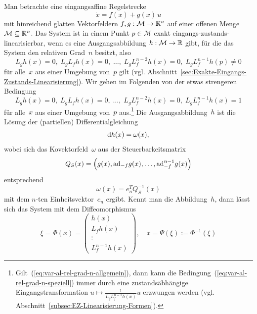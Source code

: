 Man betrachte eine eingangsaffine Regelstrecke 
\begin{equation}
\dot{x}=f(x)+g(x)\,u\label{eq:var-basissystem-ohne-ausgang}
\end{equation}
mit hinreichend glatten Vektorfeldern $f,g:\mathcal{M}\to{\mathbb{R}}^{n}$
auf einer offenen Menge $\mathcal{M}\subseteq{\mathbb{R}}^{n}$. Das System
ist in einem Punkt $p\in\mathcal{M}$ exakt eingangs-zustands-linearisierbar,
wenn es eine Ausgangsabbildung $h:\mathcal{M}\to{\mathbb{R}}$ gibt, für die
das System den relativen Grad~$n$ besitzt, also
\begin{equation}
L_{g}h(x)=0,\;L_{g}L_{f}h(x)=0,\;\ldots,\;L_{g}L_{f}^{n-2}h(x)=0,\;L_{g}L_{f}^{n-1}h(p)\neq0\label{eq:var-al-rel-grad-n-allgemein}
\end{equation}
für alle~$x$ aus einer Umgebung von~$p$ gilt (vgl. Abschnitt~\ref{sec:Exakte-Eingangs-Zustands-Linearisierung}).
Wir gehen im Folgenden von der etwas strengeren Bedingung
\begin{equation}
L_{g}h(x)=0,\;L_{g}L_{f}h(x)=0,\;\ldots,\;L_{g}L_{f}^{n-2}h(x)=0,\;L_{g}L_{f}^{n-1}h(x)=1\label{eq:var-al-rel-grad-n-speziell}
\end{equation}
für alle~$x$ aus einer Umgebung von~$p$ aus.\footnote{Gilt~(\ref{eq:var-al-rel-grad-n-allgemein}), dann kann die Bedingung~(\ref{eq:var-al-rel-grad-n-speziell})
immer durch eine zustandsäbhängige Eingangstransformation $u\mapsto\tfrac{1}{L_{g}L_{f}^{n-1}h(x)}u$
erzwungen werden (vgl. Abschnitt~\ref{subsec:EZ-Linearisierung-Formen}).} Die Ausgangsabbildung~$h$ ist die Lösung der (partiellen) Differentialgleichung
\begin{equation}
{\mathrm{d}} h(x)=\omega(x),\label{eq:var-al-dh-omega}
\end{equation}
wobei sich das Kovektorfeld~$\omega$ aus der Steuerbarkeitsmatrix
\begin{equation}
Q_{S}(x)=\left(g(x),{\operatorname{ad}}_{-f}g(x),\ldots,{\operatorname{ad}}_{-f}^{n-1}g(x)\right)\label{eq:var-al-steuerbarkeitsmatrix}
\end{equation}
entsprechend
\begin{equation}
\omega(x)=e_{n}^{T}Q_{S}^{-1}(x)\label{eq:var-al-startkovektor}
\end{equation}
mit dem $n$-ten Einheitsvektor~$e_{n}$ ergibt. Kennt man die Abbildung~$h$,
dann lässt sich das System mit dem Diffeomorphismus 
\begin{equation}
\xi=\Phi(x)=\left(\begin{array}{c}
h(x)\\
L_{f}h(x)\\
\vdots\\
L_{f}^{n-1}h(x)
\end{array}\right),\quad x=\Psi(\xi):=\Phi^{-1}(\xi)\label{eq:var-al-transformation}
\end{equation}
